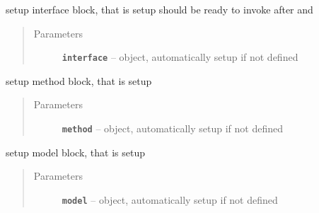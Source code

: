 \documentclass[letterpaper,10pt,english]{sphinxmanual}
\begin{document}
\begin{fulllineitems}
\begin{fulllineitems}
\begin{quote}
\begin{description}
\end{description}\end{quote}

\end{fulllineitems}


\begin{fulllineitems}
\label{src/apidocs/dakopt:genopt.dakopt.DakotaOC.set_interface}
setup interface block, that is setup 
should be ready to invoke after  and 
\begin{quote}\begin{description}
\item[{Parameters}] \leavevmode
\textbf{\texttt{interface}} --  object, automatically setup if not defined

\end{description}\end{quote}

\end{fulllineitems}


\begin{fulllineitems}
\label{src/apidocs/dakopt:genopt.dakopt.DakotaOC.set_method}
setup method block, that is setup 
\begin{quote}\begin{description}
\item[{Parameters}] \leavevmode
\textbf{\texttt{method}} --  object, automatically setup if not defined

\end{description}\end{quote}

\end{fulllineitems}


\begin{fulllineitems}
\label{src/apidocs/dakopt:genopt.dakopt.DakotaOC.set_model}
setup model block, that is setup 
\begin{quote}\begin{description}
\item[{Parameters}] \leavevmode
\textbf{\texttt{model}} --  object, automatically setup if not defined


\end{description}
\end{quote}
\end{fulllineitems}
\end{fulllineitems}
\end{document}
